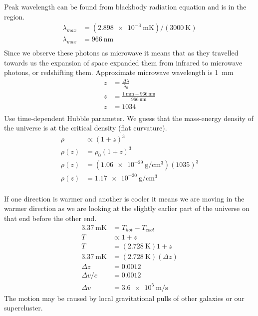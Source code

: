 \documentclass{homework}
\begin{document}
\question
Peak wavelength can be found from blackbody radiation equation and is in the  region.
\begin{align*}
    \lambda_{max}	&=	(\SI{2.898e-3}{\metre\kelvin}) / (\SI{3000}{\kelvin})	\\
    \lambda_{max}    &=	\boxed{\SI{966}{\nano\metre}}	\\
\end{align*}
Since we observe these photons as microwave it means that as they travelled towards us the expansion of space expanded them from infrared to microwave photons, or redshifting them. Approximate microwave wavelength is \SI{1}{\milli\metre}
\begin{align*}
    z   &=  \frac{\Delta \lambda}{\lambda_0}	\\
    z   &=  \frac{\SI{1}{\milli\metre} - \SI{966}{\nano\metre}}{\SI{966}{\nano\metre}}	\\
    z   &=  \boxed{1034}	\\
\end{align*}
Use time-dependent Hubble parameter. We guess that the mass-energy density of the universe is at the critical density (flat curvature).
\begin{align*}
    \rho	&\propto    (1+z)^3 \\
    \rho(z)	&=    \rho_0 (1+z)^3 \\
    \rho(z)	&=    (\SI{1.06e-29}{\gram/\centi\metre^3}) (1035)^3 \\
    \rho(z)	&=    \boxed{\SI{1.17e-20}{\gram/\centi\metre^3}} \\
\end{align*}


\question
If one direction is warmer and another is cooler it means we are moving in the warmer direction as we are looking at the slightly earlier part of the universe on that end before the other end.
\begin{align*}
    \SI{3.37}{\milli\kelvin}    &=	T_{hot} - T_{cool}	\\
    T   &\propto    1+z	\\
    T   &=    (\SI{2.728}{\kelvin})1+z	\\
    \SI{3.37}{\milli\kelvin}    &= (\SI{2.728}{\kelvin})(\Delta z) \\
    \Delta z    &=  0.0012   \\
    \Delta v/c  &=  0.0012 \\
    \Delta v    &=  \boxed{\SI{3.6e5}{\metre/\second}}
\end{align*}
The motion may be caused by local gravitational pulls of other galaxies or our supercluster.
\end{document}
